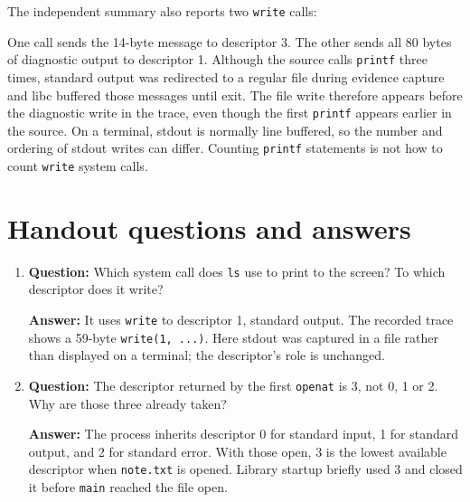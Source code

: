 \documentclass[12pt]{article}
\begin{document}
The independent summary also reports two \texttt{write} calls:


One call sends the 14-byte message to descriptor 3. The other sends all
80 bytes of diagnostic output to descriptor 1. Although the source calls
\texttt{printf} three times, standard output was redirected to a regular
file during evidence capture and libc buffered those messages until exit.
The file write therefore appears before the diagnostic write in the trace,
even though the first \texttt{printf} appears earlier in the source.
On a terminal, stdout is normally line buffered, so the number and ordering
of stdout writes can differ. Counting \texttt{printf} statements is not
how to count \texttt{write} system calls.

\section{Handout questions and answers}
\begin{enumerate}
\item \textbf{Question:} Which system call does \texttt{ls} use to print to the screen? To which descriptor does it write?
\par\textbf{Answer:} It uses \texttt{write} to descriptor 1, standard output. The recorded trace shows a 59-byte \texttt{write(1, ...)}. Here stdout was captured in a file rather than displayed on a terminal; the descriptor's role is unchanged.

\item \textbf{Question:} The descriptor returned by the first \texttt{openat} is 3, not 0, 1 or 2. Why are those three already taken?
\par\textbf{Answer:} The process inherits descriptor 0 for standard input, 1 for standard output, and 2 for standard error. With those open, 3 is the lowest available descriptor when \texttt{note.txt} is opened. Library startup briefly used 3 and closed it before \texttt{main} reached the file open.
\end{enumerate}

\clearpage
\end{document}
